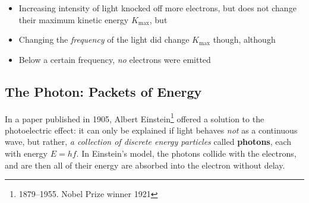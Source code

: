 \begin{center}
\end{center}
\begin{itemize}
\item Increasing intensity of light knocked off more electrons, but does not
  change their maximum kinetic energy $K_\text{max}$, but
\item Changing the \emph{frequency} of the light did change $K_\text{max}$
  though, although
\item Below a certain frequency, \emph{no} electrons were emitted
\end{itemize}




%




\subsection{The Photon: Packets of Energy}
In a paper published in 1905, Albert Einstein\footnote{1879--1955. Nobel Prize
winner 1921} offered a solution to the photoelectric effect: it can only be
explained if light behaves \emph{not} as a continuous wave, but rather, \emph{a
collection of discrete energy particles} called \textbf{photons}, each with
energy $E=hf$. In Einstein's model, the photons collide with the electrons, and
are then all of their energy are absorbed into the electron without delay.

